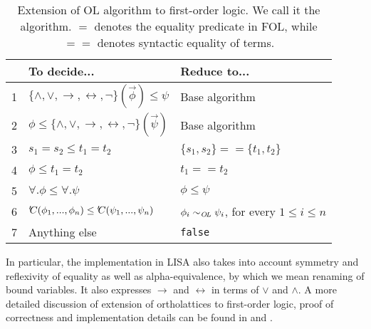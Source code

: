 \begin{table}[ht]
  \centering
  \begin{tabular}{c | l | l}
      & To decide...                                                                             & Reduce to...                                           \\
       \hline
    1 & $\lbrace \land, \lor, \rightarrow, \leftrightarrow, \neg \rbrace(\vec{\phi}) \leq \psi $ & Base algorithm                                         \\
    2 & $\phi \leq \lbrace \land, \lor, \rightarrow, \leftrightarrow, \neg \rbrace(\vec{\psi}) $ & Base algorithm                                         \\
    3 & $s_1 = s_2 \leq t_1 = t_2$                                                               & $\lbrace s_1, s_2 \rbrace == \lbrace t_1, t_2 \rbrace$ \\
    4 & $\phi \leq t_1 = t_2$                                                                    & $t_1 == t_2$                                           \\
    5 & $\forall. \phi \leq \forall. \psi$                                                       & $\phi \leq \psi$                                       \\
    6 & ${'\hspace{-0.2em}C}(\phi_1,...,\phi_n) \leq {'\hspace{-0.2em}C}(\psi_1,...,\psi_n)$                         & $\phi_i \sim_{\mathit{O{\kern-0.1em}L}} \psi_i$, for every $1 \le i \le n$    \\
       
    7 & Anything else                                                                            & \lstinline|false|
  \end{tabular}
  
  \caption{Extension of OL algorithm to first-order logic. We call it the \FOLalg{} algorithm. $=$ denotes the equality predicate in FOL, while $==$ denotes syntactic equality of terms.
  \label{tab:Olextension}}
\end{table}


In particular, the implementation in LISA also takes into account symmetry and reflexivity of equality as well as alpha-equivalence, by which we mean renaming of bound variables. It also expresses $\rightarrow$ and $\leftrightarrow$ in terms of $\lor$ and $\land$.
A more detailed discussion of extension of ortholattices to first-order logic, proof of correctness and implementation details can be found in \cite{guilloudFormulaNormalizationsVerification2023a} and \cite{guilloudLISAModernProof2023a}.




